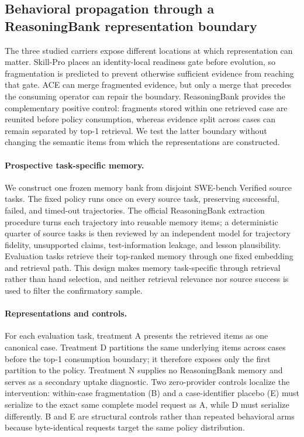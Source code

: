 
\subsection{Behavioral propagation through a ReasoningBank representation boundary}
\label{sec:reasoningbank-qwen}

The three studied carriers expose different locations at which representation can
matter. Skill-Pro places an identity-local readiness gate before evolution, so
fragmentation is predicted to prevent otherwise sufficient evidence from reaching
that gate. ACE can merge fragmented evidence, but only a merge that precedes the
consuming operator can repair the boundary. ReasoningBank provides the complementary
positive control: fragments stored within one retrieved case are reunited before
policy consumption, whereas evidence split across cases can remain separated by
top-1 retrieval. We test the latter boundary without changing the semantic items
from which the representations are constructed.

\paragraph{Prospective task-specific memory.}
We construct one frozen memory bank from disjoint SWE-bench Verified source tasks.
The fixed policy runs once on every source task, preserving successful, failed, and
timed-out trajectories. The official ReasoningBank extraction procedure turns each
trajectory into reusable memory items; a deterministic quarter of source tasks is
then reviewed by an independent model for trajectory fidelity, unsupported claims,
test-information leakage, and lesson plausibility. Evaluation tasks retrieve their
top-ranked memory through one fixed embedding and retrieval path. This design makes
memory task-specific through retrieval rather than hand selection, and neither
retrieval relevance nor source success is used to filter the confirmatory sample.

\paragraph{Representations and controls.}
For each evaluation task, treatment A presents the retrieved items as one canonical
case. Treatment D partitions the same underlying items across cases before the
top-1 consumption boundary; it therefore exposes only the first partition to the
policy. Treatment N supplies no ReasoningBank memory and serves as a secondary
uptake diagnostic. Two zero-provider controls localize the intervention: within-case
fragmentation (B) and a case-identifier placebo (E) must serialize to the exact same
complete model request as A, while D must serialize differently. B and E are
structural controls rather than repeated behavioral arms because byte-identical
requests target the same policy distribution.

